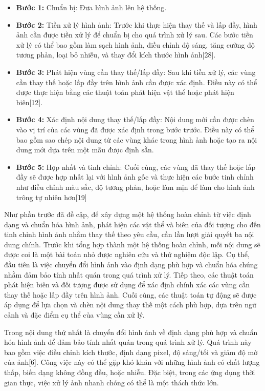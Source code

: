 \documentclass[12pt]{report}
\begin{document}
\begin{itemize}
    \item \textbf{Bước 1:} Chuẩn bị: Đưa hình ảnh lên hệ thống.
    \item \textbf{Bước 2:} Tiền xử lý hình ảnh: Trước khi thực hiện thay thế và lấp đầy, hình ảnh cần được tiền xử lý để chuẩn bị cho quá trình xử lý sau. Các bước tiền xử lý có thể bao gồm làm sạch hình ảnh, điều chỉnh độ sáng, tăng cường độ tương phản, loại bỏ nhiễu, và thay đổi kích thước hình ảnh[28].
    \item \textbf{Bước 3:} Phát hiện vùng cần thay thế/lấp đầy: Sau khi tiền xử lý, các vùng cần thay thế hoặc lấp đầy trên hình ảnh cần được xác định. Điều này có thể được thực hiện bằng các thuật toán phát hiện vật thể hoặc phát hiện biên[12].
    \item \textbf{Bước 4:} Xác định nội dung thay thế/lấp đầy: Nội dung mới cần được chèn vào vị trí của các vùng đã được xác định trong bước trước. Điều này có thể bao gồm sao chép nội dung từ các vùng khác trong hình ảnh hoặc tạo ra nội dung mới dựa trên một mẫu được định sẵn.
    \item \textbf{Bước 5:} Hợp nhất và tinh chỉnh: Cuối cùng, các vùng đã thay thế hoặc lấp đầy sẽ được hợp nhất lại với hình ảnh gốc và thực hiện các bước tinh chỉnh như điều chỉnh màu sắc, độ tương phản, hoặc làm mịn để làm cho hình ảnh trông tự nhiên hơn[19]
\end{itemize}
Như phần trước đã đề cập, để xây dựng một hệ thống hoàn chỉnh từ việc định dạng và chuẩn hóa hình ảnh, phát hiện các vật thể và biên của đối tượng cho đến tinh chỉnh hình ảnh nhằm thay thế theo yêu cầu, cần lần lượt giải quyết ba nội dung chính. Trước khi tổng hợp thành một hệ thống hoàn chỉnh, mỗi nội dung sẽ được coi là một bài toán nhỏ được nghiên cứu và thử nghiệm độc lập. Cụ thể, đầu tiên là việc chuyển đổi hình ảnh vào định dạng phù hợp và chuẩn hóa chúng nhằm đảm bảo tính nhất quán trong quá trình xử lý. Tiếp theo, các thuật toán phát hiện biên và đối tượng được sử dụng để xác định chính xác các vùng cần thay thế hoặc lấp đầy trên hình ảnh. Cuối cùng, các thuật toán tự động sẽ được áp dụng để lựa chọn và chèn nội dung thay thế một cách phù hợp, dựa trên ngữ cảnh và đặc điểm cụ thể của vùng cần xử lý.

Trong nội dung thứ nhất là chuyển đổi hình ảnh về định dạng phù hợp và chuẩn hóa hình ảnh để đảm bảo tính nhất quán trong quá trình xử lý. Quá trình này bao gồm việc điều chỉnh kích thước, định dạng pixel, độ sáng/tối và giảm độ mờ của ảnh[6]. Công việc này có thể gặp khó khăn với những hình ảnh có chất lượng thấp, biến dạng không đồng đều, hoặc nhiễu. Đặc biệt, trong các ứng dụng thời gian thực, việc xử lý ảnh nhanh chóng có thể là một thách thức lớn.
\end{document}
